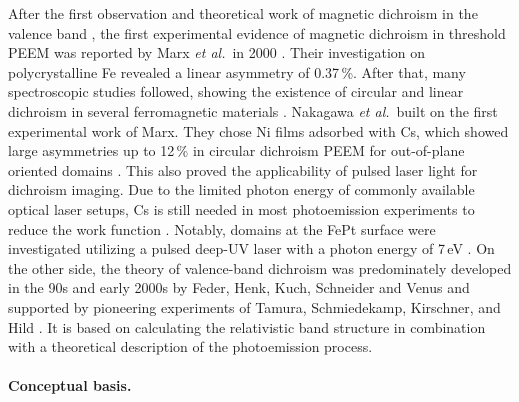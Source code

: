 \documentclass[prl,twocolumn,floatfix]{revtex4-2}
\begin{document}
 After the first observation and theoretical work of magnetic dichroism in the valence band \cite{schneider1991,henk1996,feder1996}, the first experimental evidence of magnetic dichroism in threshold PEEM was reported by Marx \textit{et al.}\ in 2000 \cite{marx2000}. Their investigation on polycrystalline Fe revealed a linear asymmetry of 0.37\,\%. After that, many spectroscopic studies followed, showing the existence of circular and linear dichroism in several ferromagnetic materials \cite{nakagawa2006,hild2008,hild2009,hild2010,hild2012}. Nakagawa \textit{et al.}\ built on the first experimental work of Marx. They chose Ni films adsorbed with Cs, which showed large asymmetries up to 12\,\% in circular dichroism PEEM for out-of-plane oriented domains \cite{nakagawa2007,nakagawa2009,nakagawa2012}. This also proved the applicability of pulsed laser light for dichroism imaging. Due to the limited photon energy of commonly available optical laser setups, Cs is still needed in most photoemission experiments to reduce the work function \cite{kronseder2011, meier2017}. Notably, domains at the FePt surface were investigated utilizing a pulsed deep-UV laser with a photon energy of 7\,eV \cite{zhao2019}. 
On the other side, the theory of valence-band dichroism was predominately developed in the 90s and early 2000s by Feder, Henk, Kuch, Schneider and Venus \cite{feder1996,henk1996,kuch1996a,kuch2001,venus1994,venus1997} and supported by pioneering experiments of Tamura, Schmiedekamp, Kirschner, and Hild \cite{tamura1987, schmiedeskamp1988, venus95, hild2008, hild2009, hild2010}. It is based on calculating the relativistic band structure in combination with a theoretical description of the photoemission process. 



\paragraph{Conceptual basis.} 
\end{document}
